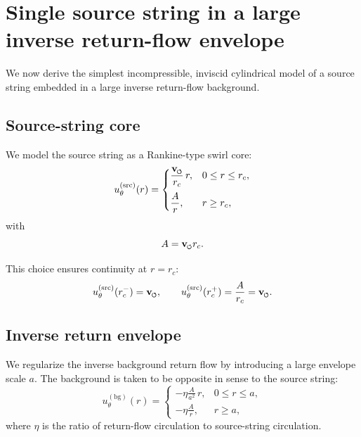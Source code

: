\documentclass[11pt]{article}
\newcommand{\swirlarrow}{\mathchoice{\mkern-2mu\scriptstyle\boldsymbol{\circlearrowleft}}{\mkern-2mu\scriptstyle\boldsymbol{\circlearrowleft}}{\mkern-2mu\scriptscriptstyle\boldsymbol{\circlearrowleft}}{\mkern-2mu\scriptscriptstyle\boldsymbol{\circlearrowleft}}}
\newcommand{\vswirl}{\mathbf{v}_{\swirlarrow}}
\newcommand{\rc}{r_c}
\newcommand{\src}{\mathrm{src}}
\newcommand{\bg}{\mathrm{bg}}
\begin{document}
        \section{Single source string in a large inverse return-flow envelope}
        
        We now derive the simplest incompressible, inviscid cylindrical model of a source string embedded in a large inverse return-flow background.
        
        \subsection{Source-string core}
            
            We model the source string as a Rankine-type swirl core:
            \begin{equation}
                u_\theta^{(\src)}(r)
                =
                \begin{cases}
                    \displaystyle \frac{\vswirl}{\rc}\,r, & 0\le r\le \rc, \\[1em]
                    \displaystyle \frac{A}{r}, & r\ge \rc,
                \end{cases}
                \label{eq:u-src}
            \end{equation}
            with
            \[
                A=\vswirl \rc.
            \]
            
            This choice ensures continuity at \(r=\rc\):
            \[
                u_\theta^{(\src)}(\rc^-)=\vswirl,
                \qquad
                u_\theta^{(\src)}(\rc^+)=\frac{A}{\rc}=\vswirl.
            \]
        
        \subsection{Inverse return envelope}
            
            We regularize the inverse background return flow by introducing a large envelope scale \(a\). The background is taken to be opposite in sense to the source string:
            \begin{equation}
                u_\theta^{(\bg)}(r)
                =
                \begin{cases}
                    \displaystyle -\eta \frac{A}{a^2}\,r, & 0\le r\le a, \\[1em]
                    \displaystyle -\eta \frac{A}{r}, & r\ge a,
                \end{cases}
                \label{eq:u-bg}
            \end{equation}
            where \(\eta\) is the ratio of return-flow circulation to source-string circulation.
            
\end{document}
